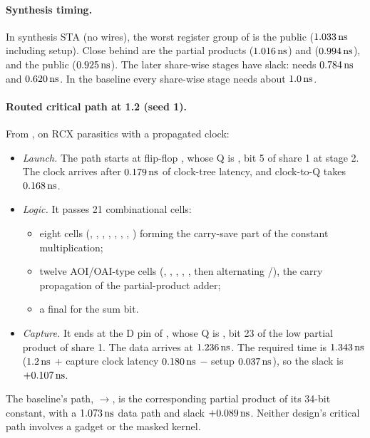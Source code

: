 \paragraph{Synthesis timing.} In synthesis STA (no wires), the worst register group of  is the public  ($1.033\,\si{\nano\second}$ including setup). Close behind are the partial products  ($1.016\,\si{\nano\second}$) and  ($0.994\,\si{\nano\second}$), and the public  ($0.925\,\si{\nano\second}$). The later share-wise stages have slack:  needs $0.784\,\si{\nano\second}$ and  $0.620\,\si{\nano\second}$. In the baseline every share-wise stage needs about $1.0\,\si{\nano\second}$.

\paragraph{Routed critical path at 1.2\ns{} (seed 1).} From , on RCX parasitics with a propagated clock:
\begin{itemize}
  \item \emph{Launch.} The path starts at flip-flop , whose Q is , bit 5 of share 1 at stage 2. The clock arrives after $0.179\,\si{\nano\second}$ of clock-tree latency, and clock-to-Q takes $0.168\,\si{\nano\second}$.
  \item \emph{Logic.} It passes 21 combinational cells:
    \begin{itemize}
      \item eight cells (, , , , , , , ) forming the carry-save part of the constant multiplication;
      \item twelve AOI/OAI-type cells (, , , , , then alternating /), the carry propagation of the partial-product adder;
      \item a final  for the sum bit.
    \end{itemize}
  \item \emph{Capture.} It ends at the D pin of , whose Q is , bit 23 of the low partial product of share 1. The data arrives at $1.236\,\si{\nano\second}$. The required time is $1.343\,\si{\nano\second}$ ($1.2\,\si{\nano\second}$ + capture clock latency $0.180\,\si{\nano\second}$ $-$ setup $0.037\,\si{\nano\second}$), so the slack is $+0.107\,\si{\nano\second}$.
\end{itemize}
The baseline's path, $\to$, is the corresponding partial product of its 34-bit constant, with a $1.073\,\si{\nano\second}$ data path and slack $+0.089\,\si{\nano\second}$. Neither design's critical path involves a gadget or the masked kernel.

